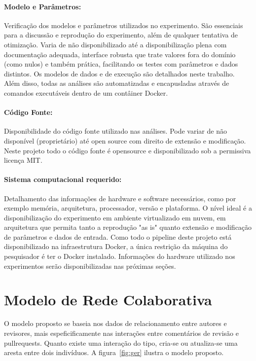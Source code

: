 \documentclass[a4paper,12pt]{monografia}
\theoremstyle{plain}
\theoremstyle{definition}
\theoremstyle{remark}
\begin{document}
\paragraph{Modelo e Parâmetros:} Verificação dos modelos e parâmetros utilizados no experimento. São essenciais para a discussão e reprodução do experimento, além de qualquer tentativa de otimização. Varia de não disponibilizado até a disponibilização plena com documentação adequada, interface robusta que trate valores fora do domínio (como nulos) e também prática, facilitando os testes com parâmetros e dados distintos. Os modelos de dados e de execução são detalhados neste trabalho. Além disso, todas as análises são automatizadas e encapusladas através de comandos executáveis dentro de um contâiner Docker.

\paragraph{Código Fonte:} Disponibilidade do código fonte utilizado nas análises. Pode variar de não disponível (proprietário) até open source com direito de extensão e modificação. Neste projeto todo o código fonte é opensource e disponibilizado sob a permissiva licença MIT.

\paragraph{Sistema computacional requerido:} Detalhamento das informações de hardware e software necessários, como por exemplo memória, arquitetura, processador, versão e plataforma. O nível ideal é a disponibilização do experimento em ambiente virtualizado em nuvem, em arquitetura que permita tanto a reprodução "as is" quanto extensão e modificação de parâmetros e dados de entrada. Como todo o pipeline deste projeto está disponibilizado na infraestrutura Docker, a única restrição da máquina do pesquisador é ter o Docker instalado. Informações do hardware utilizado nos experimentos serão disponibilizadas nas próximas seções.


\section{Modelo de Rede Colaborativa}

O modelo proposto se baseia nos dados de relacionamento entre autores e revisores, mais espeficificamente nas interações entre comentários de revisão e pullrequests. Quanto existe uma interação do tipo, cria-se ou atualiza-se uma aresta entre dois indivíduos. A figura~\ref{fig:ger} ilustra o modelo proposto.
\end{document}
